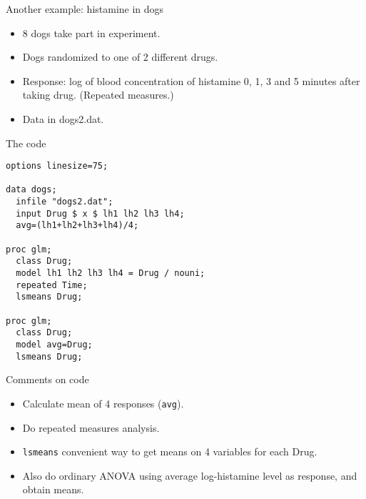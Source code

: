 \documentclass[pdf]{prosper}
\begin{document}
\begin{slide}{Another example: histamine in dogs}
  
  \begin{itemize}
  \item 8 dogs take part in experiment.
  \item Dogs randomized to one of 2 different drugs.
  \item Response: log of blood concentration of histamine 0, 1, 3 and 5 minutes after taking drug. (Repeated measures.)
  \item Data in dogs2.dat.
  \end{itemize}

\end{slide}

  \begin{slide}{The code}

\begin{verbatim}
options linesize=75;

data dogs;
  infile "dogs2.dat";
  input Drug $ x $ lh1 lh2 lh3 lh4;
  avg=(lh1+lh2+lh3+lh4)/4;

proc glm;
  class Drug;
  model lh1 lh2 lh3 lh4 = Drug / nouni;
  repeated Time;
  lsmeans Drug;

proc glm;
  class Drug;
  model avg=Drug;
  lsmeans Drug;

\end{verbatim}
    
  \end{slide}

  \begin{slide}{Comments on code}
    \begin{itemize}
    \item Calculate mean of 4 responses (\verb-avg-).
    \item Do repeated measures analysis.
    \item \verb-lsmeans- convenient way to get means on 4 variables
      for each Drug.
    \item Also do ordinary ANOVA using average log-histamine level as response, and obtain means.
    \end{itemize}
    
  \end{slide}
\end{document}
